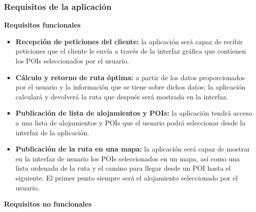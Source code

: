 \subsubsection[Requisitos internos]{Requisitos de la aplicación}
\textbf{Requisitos funcionales}
\begin{itemize}
	\item \textbf{Recepción de peticiones del cliente:} la aplicación será capaz de recibir peticiones que el cliente le envía a través de la interfaz gráfica que contienen los POIs seleccionados por el usuario.
	\item \textbf{Cálculo y retorno de ruta óptima:} a partir de los datos proporcionados por el usuario y la información que se tiene sobre dichos datos; la aplicación calculará y devolverá la ruta que después será mostrada en la interfaz.
	\item \textbf{Publicación de lista de alojamientos y POIs:} la aplicación tendrá acceso a una lista de alojamientos y POIs que el usuario podrá seleccionar desde la interfaz de la aplicación.
	\item \textbf{Publicación de la ruta en una mapa:} la aplicación será capaz de mostrar en la interfaz de usuario los POIs seleccionados en un mapa, así como una lista ordenada de la ruta y el camino para llegar desde un POI hasta el siguiente. El primer punto siempre será el alojamiento seleccionado por el usuario.
\end{itemize}
\textbf{Requisitos no funcionales}
